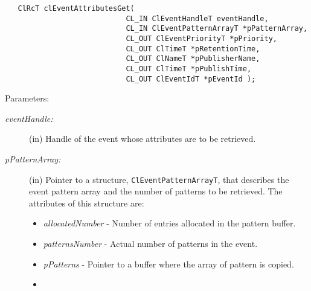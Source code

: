 \begin{flushleft}
\begin{Desc}
\footnotesize\begin{verbatim}   ClRcT clEventAttributesGet(
              				CL_IN ClEventHandleT eventHandle,
              				CL_IN ClEventPatternArrayT *pPatternArray,
              				CL_OUT ClEventPriorityT *pPriority,
              				CL_OUT ClTimeT *pRetentionTime,
              				CL_OUT ClNameT *pPublisherName,
              				CL_OUT ClTimeT *pPublishTime,
              				CL_OUT ClEventIdT *pEventId );
\end{verbatim}
\normalsize
\end{Desc}
\begin{Desc}
\item[Parameters:]
\begin{description}
\item[{\em event\-Handle:}](in) Handle of the event whose attributes are to be retrieved.
\item[{\em p\-Pattern\-Array:}](in) Pointer to a structure, {\tt{ClEventPatternArrayT}}, that describes the event pattern array and the number of patterns to be 
retrieved. The attributes of this structure are:
\begin{itemize}
\item

\textit{allocatedNumber} - Number of entries allocated in the pattern buffer. 
\item

\textit{patternsNumber} -  Actual number of patterns in the event. 
\item

\textit{pPatterns} -  Pointer to a buffer where the array of pattern is copied. 
\item


\end{itemize}
\end{description}
\end{Desc}
\end{flushleft}
